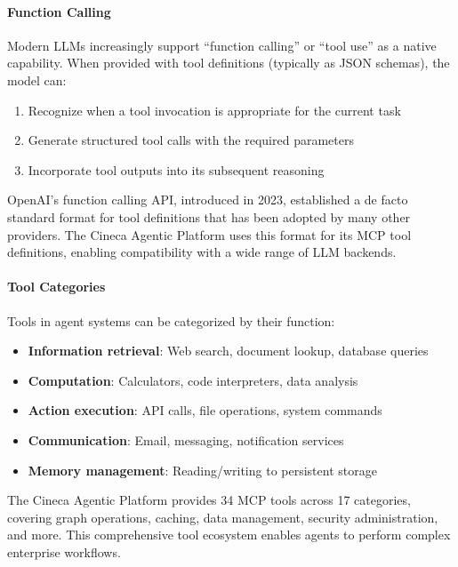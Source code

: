 \documentclass[a4paper,twoside]{sapthesis}
\begin{document}
\paragraph{Function Calling}
Modern LLMs increasingly support ``function calling'' or ``tool use'' as a native capability. When provided with tool definitions (typically as JSON schemas), the model can:
\begin{enumerate}
    \item Recognize when a tool invocation is appropriate for the current task
    \item Generate structured tool calls with the required parameters
    \item Incorporate tool outputs into its subsequent reasoning
\end{enumerate}

OpenAI's function calling API, introduced in 2023, established a de facto standard format for tool definitions that has been adopted by many other providers. The Cineca Agentic Platform uses this format for its MCP tool definitions, enabling compatibility with a wide range of LLM backends.

\paragraph{Tool Categories}
Tools in agent systems can be categorized by their function:
\begin{itemize}
    \item \textbf{Information retrieval}: Web search, document lookup, database queries
    \item \textbf{Computation}: Calculators, code interpreters, data analysis
    \item \textbf{Action execution}: API calls, file operations, system commands
    \item \textbf{Communication}: Email, messaging, notification services
    \item \textbf{Memory management}: Reading/writing to persistent storage
\end{itemize}

The Cineca Agentic Platform provides 34 MCP tools across 17 categories, covering graph operations, caching, data management, security administration, and more. This comprehensive tool ecosystem enables agents to perform complex enterprise workflows.
\end{document}
